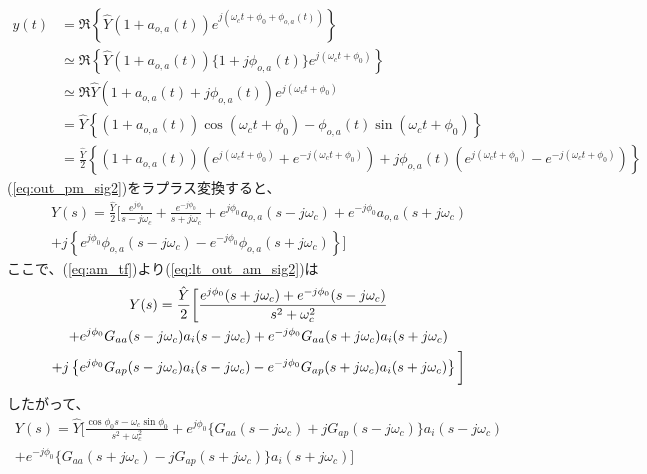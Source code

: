 \documentclass[book]{jlreq}
\begin{document}
\begin{equation}
    \begin{split}
        y(t) &= \Re\left \{\hat{Y}(1 + a_{o,a}(t))e^{j(\omega_c t + \phi_0 + \phi_{o,a} (t))}\right \} \\
        &\simeq \Re\left \{\hat{Y}(1 + a_{o, a}(t))\{1 + j \phi_{o, a} (t)\}e^{j(\omega_c t +  \phi_0)}\right \} \\
        &\simeq\Re{\hat{Y}(1 + a_{o, a}(t)+ j \phi_{o, a} (t))e^{j(\omega_c t +  \phi_0)}} \\
        &= \hat{Y}\left \{(1+ a_{o,a}(t))\cos(\omega_c t +  \phi_0)
        - \phi_{o, a}(t)\sin(\omega_c t +  \phi_0) \right \} \\
        &= \frac{\hat{Y}}{2}\left \{\left (1+a_{o,a}(t)\right )\left (e^{j(\omega_c t
                + \phi_0)}+e^{-j(\omega_c t+\phi_0)}\right )
        +j \phi_{o,a}(t)\left (e^{j(\omega_c t+\phi_0)}-e^{-j(\omega_c t + \phi_0)}\right ) \right \}
        \label{eq:out_pm_sig2}
    \end{split}
\end{equation}
%
(\ref{eq:out_pm_sig2})をラプラス変換すると、
%
\begin{multline}
    Y(s) = \frac{\hat{Y}}{2}\biggr [\frac{e^{j\phi_0}}{s-j\omega_c}+\frac{e^{-j\phi_0}}{s+j\omega_c}
    + e^{j\phi_0}a_{o, a}(s - j\omega_c) + e^{-j\phi_0}a_{o, a}(s+j\omega_c) \\
    + j\left \{e^{j\phi_0}\phi_{o,a}(s-j\omega_c) - e^{-j\phi_0}\phi_{o,a}(s+j\omega_c) \right \} \biggl ]
    \label{eq:lt_out_am_sig2}
\end{multline}
%
ここで、(\ref{eq:am_tf})より(\ref{eq:lt_out_am_sig2})は
%
\begin{multline}
    Y(s) = \frac{\hat{Y}}{2}\biggr [\frac{e^{j\phi_0}(s+j\omega_c) + e^{-j\phi_0}(s-j\omega_c)}{s^2 + \omega_c^2}\\
    + e^{j\phi_0}G_{aa}(s-j\omega_c)a_i(s - j\omega_c) + e^{-j\phi_0}G_{aa}(s+j\omega_c)a_i(s+j\omega_c) \\
    + j\left \{e^{j\phi_0}G_{ap}(s-j\omega_c)a_i(s-j\omega_c)
    - e^{-j\phi_0}G_{ap}(s+j\omega_c)a_i(s+j\omega_c) \right \} \biggl ]\notag
\end{multline}
%
したがって、
%
\begin{multline}
    Y(s) = \hat{Y}\biggr [\frac{\cos\phi_0 s - \omega_c\sin\phi_0}{s^2+\omega_c^2}
        + e^{j\phi_0}\{G_{aa}(s-j\omega_c)+j G_{ap}(s-j\omega_c)\}a_i(s-j\omega_c) \\
        + e^{-j\phi_0}\{G_{aa}(s+j\omega_c)- j G_{ap}(s+j\omega_c)\}a_i(s+j\omega_c)\biggl ]
    \label{eq:lt_out_am_sig3}
\end{multline}
\end{document}
